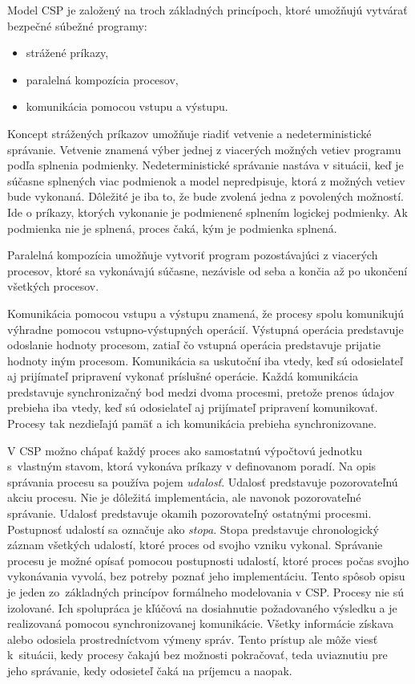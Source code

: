\documentclass[
  biblatex,
  seconds=true,
  language=slovak,
  figures=false,
  urldate=iso,
  glossaries,
  index
]{kidiplom}
\begin{document}
Model CSP je založený na troch základných princípoch, ktoré umožňujú vytvárať bezpečné súbežné programy:
\begin{itemize}
	\item strážené príkazy,
	\item paralelná kompozícia procesov,
	\item komunikácia pomocou vstupu a výstupu.
\end{itemize}
Koncept strážených príkazov umožňuje riadiť vetvenie a nedeterministické správanie. Vetvenie znamená výber jednej z viacerých možných vetiev programu podľa splnenia podmienky. Nedeterministické správanie nastáva v situácii, keď je súčasne splnených viac podmienok a model nepredpisuje, ktorá z možných vetiev bude vykonaná. Dôležité je iba to, že bude zvolená jedna z povolených možností.
Ide o príkazy, ktorých vykonanie je podmienené splnením logickej podmienky.
Ak podmienka nie je splnená, proces čaká, kým je podmienka splnená.

Paralelná kompozícia umožňuje vytvoriť program pozostávajúci z viacerých procesov, ktoré sa vykonávajú súčasne, nezávisle od seba a končia až po ukončení všetkých procesov. 

Komunikácia pomocou vstupu a výstupu znamená, že procesy spolu komunikujú výhradne
pomocou vstupno-výstupných operácií. Výstupná operácia predstavuje odoslanie hodnoty procesom, zatiaľ čo vstupná operácia predstavuje prijatie hodnoty iným procesom. Komunikácia sa uskutoční iba vtedy, keď sú odosielateľ aj prijímateľ pripravení vykonať príslušné operácie.
Každá komunikácia predstavuje synchronizačný bod medzi dvoma procesmi, pretože prenos údajov prebieha iba vtedy, keď sú odosielateľ aj prijímateľ pripravení komunikovať.
Procesy tak nezdieľajú pamäť a ich komunikácia prebieha synchronizovane.

V CSP možno chápať každý proces ako samostatnú výpočtovú jednotku s~vlastným stavom, ktorá vykonáva príkazy v definovanom poradí.
Na opis správania procesu sa používa pojem \emph{udalosť}. Udalosť predstavuje pozorovateľnú akciu procesu. Nie je dôležitá implementácia, ale navonok pozorovateľné správanie.
Udalosť predstavuje okamih
pozorovateľný ostatnými procesmi. Postupnosť udalostí sa označuje ako \emph{stopa}. Stopa predstavuje
chronologický záznam všetkých udalostí, ktoré proces od svojho vzniku vykonal.
Správanie procesu je možné opísať pomocou postupnosti udalostí, ktoré proces počas svojho vykonávania vyvolá, bez potreby poznať jeho implementáciu.
Tento spôsob opisu je jeden zo~základných princípov formálneho modelovania v CSP.
Procesy nie sú izolované. Ich spolupráca je kľúčová na dosiahnutie požadovaného výsledku a je realizovaná
pomocou synchronizovanej komunikácie.
Všetky informácie získava alebo odosiela
prostredníctvom výmeny správ. 
Tento prístup ale môže viesť k~situácii, kedy procesy čakajú bez možnosti pokračovať, teda uviaznutiu pre jeho správanie, kedy odosieteľ čaká na príjemcu a naopak.
\end{document}

